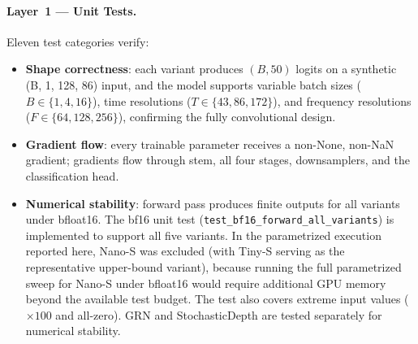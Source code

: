 \documentclass{article}
\begin{document}
\paragraph{Layer~1 --- Unit Tests.}
Eleven test categories verify:
\begin{itemize}
  \item \textbf{Shape correctness}: each variant produces $(B, 50)$ logits on a
  synthetic (B, 1, 128, 86) input, and the model supports variable batch sizes
  ($B \in \{1, 4, 16\}$), time resolutions ($T \in \{43, 86, 172\}$), and
  frequency resolutions ($F \in \{64, 128, 256\}$), confirming the fully
  convolutional design.
  \item \textbf{Gradient flow}: every trainable parameter receives a non-None,
  non-NaN gradient; gradients flow through stem, all four stages, downsamplers,
  and the classification head.
  \item \textbf{Numerical stability}: forward pass produces finite outputs for
  all variants under bfloat16. The bf16 unit test
  (\texttt{test\_bf16\_forward\_all\_variants}) is implemented to support all
  five variants. In the parametrized execution reported here, Nano-S was
  excluded (with Tiny-S serving as the representative upper-bound variant),
  because running the full parametrized sweep for Nano-S under bfloat16 would
  require additional GPU memory beyond the available test budget. The test also
  covers extreme input values ($\times 100$ and all-zero). GRN and
  StochasticDepth are tested separately for numerical stability.
\end{itemize}
\end{document}
